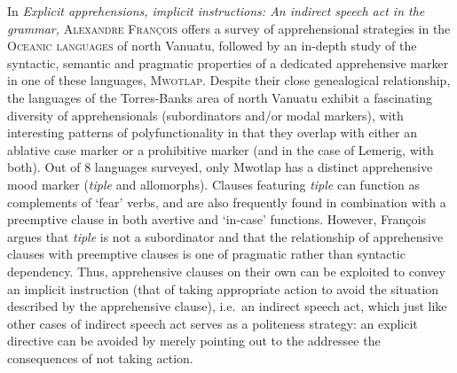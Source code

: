 \documentclass[output=paper,colorlinks,citecolor=brown
]{langscibook}
\begin{document}
In \textit{Explicit apprehensions, implicit instructions: An indirect speech act in the grammar,} \textsc{Alexandre} \textsc{François} offers a survey of apprehensional strategies in the \textsc{Oceanic} \textsc{languages} of north Vanuatu, followed by an in-depth study of the syntactic, semantic and pragmatic properties of a dedicated apprehensive marker in one of these languages, \textsc{Mwotlap}. Despite their close genealogical relationship, the languages of the Torres-Banks area of north Vanuatu exhibit a fascinating diversity of apprehensionals (subordinators and/or modal markers), with interesting patterns of polyfunctionality in that they overlap with either an ablative case marker or a prohibitive marker (and in the case of Lemerig, with both). Out of 8 languages surveyed, only Mwotlap has a distinct apprehensive mood marker (\textit{tiple} and allomorphs). Clauses featuring \textit{tiple} can function as complements of `fear' verbs, and are also frequently found in combination with a preemptive clause in both avertive and `in-case' functions. However, François argues that \textit{tiple} is not a subordinator and that the relationship of apprehensive clauses with preemptive clauses is one of pragmatic rather than syntactic dependency. Thus, apprehensive clauses on their own can be exploited to convey an implicit instruction (that of taking appropriate action to avoid the situation described by the apprehensive clause), i.e.\ an indirect speech act, which just like other cases of indirect speech act serves as a politeness strategy: an explicit directive can be avoided by merely pointing out to the addressee the consequences of not taking action.
\end{document}
